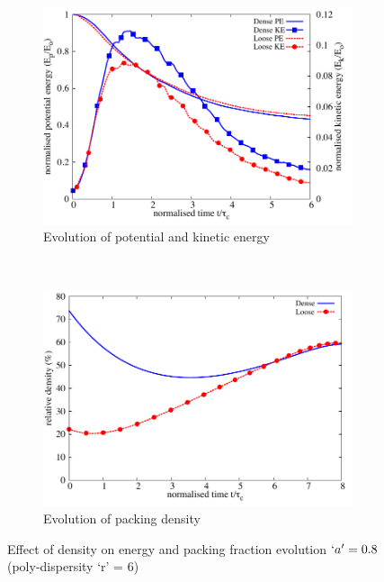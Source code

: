 \begin{figure}[tbhp]
\centering
\begin{subfigure}[b]{0.75\textwidth}
\centering
\includegraphics[width=\textwidth]{Energy_dense_r6}
\caption{Evolution of potential and kinetic energy}
\label{fig:Energy_dense_r6}
\end{subfigure}
\\
\begin{subfigure}[b]{0.75\textwidth}
\centering
\includegraphics[width=\textwidth]{voro_r6}
\caption{Evolution of packing density}
\label{fig:voro_r6}
\end{subfigure}
\caption{Effect of density on energy and packing fraction evolution $`a' = 0.8$ 
(poly-dispersity `r' = 6)}
\label{fig:Energy_voro_r6}
\end{figure}


